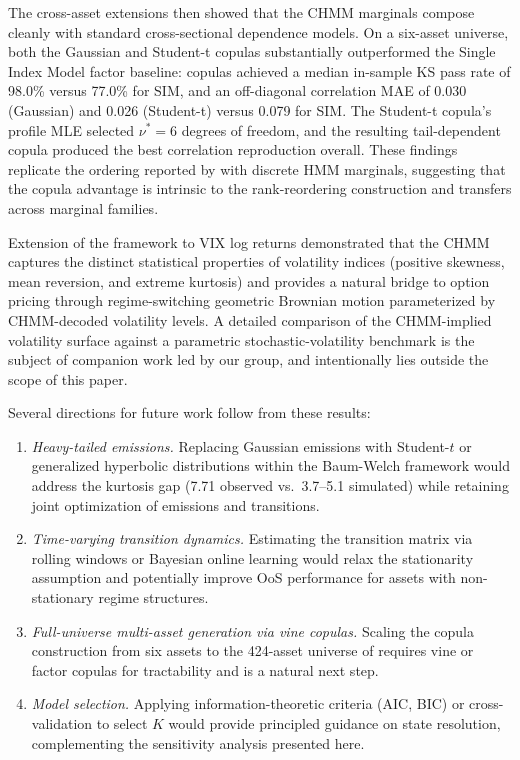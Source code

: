 The cross-asset extensions then showed that the CHMM marginals compose cleanly with standard cross-sectional dependence models.
On a six-asset universe, both the Gaussian and Student-t copulas substantially outperformed the Single Index Model factor baseline: copulas achieved a median in-sample KS pass rate of 98.0\% versus 77.0\% for SIM, and an off-diagonal correlation MAE of 0.030 (Gaussian) and 0.026 (Student-t) versus 0.079 for SIM.
The Student-t copula's profile MLE selected $\nu^* = 6$ degrees of freedom, and the resulting tail-dependent copula produced the best correlation reproduction overall.
These findings replicate the ordering reported by \citet{alswaidan2026hybrid} with discrete HMM marginals, suggesting that the copula advantage is intrinsic to the rank-reordering construction and transfers across marginal families.

Extension of the framework to VIX log returns demonstrated that the CHMM captures the distinct statistical properties of volatility indices (positive skewness, mean reversion, and extreme kurtosis) and provides a natural bridge to option pricing through regime-switching geometric Brownian motion parameterized by CHMM-decoded volatility levels.
A detailed comparison of the CHMM-implied volatility surface against a parametric stochastic-volatility benchmark is the subject of companion work led by our group, and intentionally lies outside the scope of this paper.

Several directions for future work follow from these results:
\begin{enumerate}
    \item \textit{Heavy-tailed emissions.}
    Replacing Gaussian emissions with Student-$t$ or generalized hyperbolic distributions within the Baum-Welch framework would address the kurtosis gap (7.71 observed vs.\ 3.7--5.1 simulated) while retaining joint optimization of emissions and transitions.

    \item \textit{Time-varying transition dynamics.}
    Estimating the transition matrix via rolling windows or Bayesian online learning would relax the stationarity assumption and potentially improve OoS performance for assets with non-stationary regime structures.

    \item \textit{Full-universe multi-asset generation via vine copulas.}
    Scaling the copula construction from six assets to the 424-asset universe of \citet{alswaidan2026hybrid} requires vine or factor copulas for tractability and is a natural next step.

    \item \textit{Model selection.}
    Applying information-theoretic criteria (AIC, BIC) or cross-validation to select $K$ would provide principled guidance on state resolution, complementing the sensitivity analysis presented here.
\end{enumerate}

